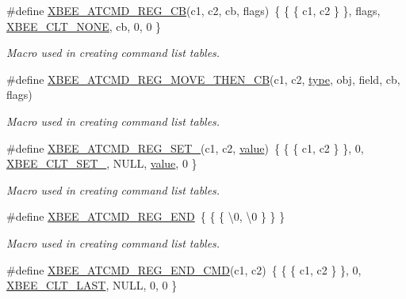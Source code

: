 \begin{DoxyCompactItemize}
\#define \hyperlink{group__xbee__atcmd_gabbaf60bd4d186b860fd58c8a6111e9f9}{X\+B\+E\+E\+\_\+\+A\+T\+C\+M\+D\+\_\+\+R\+E\+G\+\_\+\+CB}(c1,  c2,  cb,  flags)~\{ \{ \{ c1, c2 \} \}, flags, \hyperlink{group__xbee__atcmd_gga1bd8ecd38c107579d20ded3c79a7d70ba01bd43706bd844415cc0882b861df4d1}{X\+B\+E\+E\+\_\+\+C\+L\+T\+\_\+\+N\+O\+NE}, cb, 0, 0 \}
\begin{DoxyCompactList}\small\item\em Macro used in creating command list tables. \end{DoxyCompactList}\item 
\#define \hyperlink{group__xbee__atcmd_gaf5f12cd2d94f9f4ecf0a679196a6ed21}{X\+B\+E\+E\+\_\+\+A\+T\+C\+M\+D\+\_\+\+R\+E\+G\+\_\+\+M\+O\+V\+E\+\_\+\+T\+H\+E\+N\+\_\+\+CB}(c1,  c2,  \hyperlink{group__zcl_ga1d127017fb298b889f4ba24752d08b8e}{type},  obj,  field,  cb,  flags)
\begin{DoxyCompactList}\small\item\em Macro used in creating command list tables. \end{DoxyCompactList}\item 
\#define \hyperlink{group__xbee__atcmd_ga37dcc1cfc854d7876be99eff279bf2a0}{X\+B\+E\+E\+\_\+\+A\+T\+C\+M\+D\+\_\+\+R\+E\+G\+\_\+\+S\+E\+T\+\_}(c1,  c2,  \hyperlink{group__zcl_ga1ed5b151a90f7e99af8cca2e6875ddf4}{value})~\{ \{ \{ c1, c2 \} \}, 0, \hyperlink{group__xbee__atcmd_gga1bd8ecd38c107579d20ded3c79a7d70ba0eb2ffa9c761ab74335695f818ce8410}{X\+B\+E\+E\+\_\+\+C\+L\+T\+\_\+\+S\+E\+T\+\_}, N\+U\+LL, \hyperlink{group__zcl_ga1ed5b151a90f7e99af8cca2e6875ddf4}{value}, 0 \}
\begin{DoxyCompactList}\small\item\em Macro used in creating command list tables. \end{DoxyCompactList}\item 
\#define \hyperlink{group__xbee__atcmd_ga22fe547f7ae9fd0b090c5e45f03c162d}{X\+B\+E\+E\+\_\+\+A\+T\+C\+M\+D\+\_\+\+R\+E\+G\+\_\+\+E\+ND}~\{ \{ \{ \textquotesingle{}\textbackslash{}0\textquotesingle{}, \textquotesingle{}\textbackslash{}0\textquotesingle{} \} \} \}
\begin{DoxyCompactList}\small\item\em Macro used in creating command list tables. \end{DoxyCompactList}\item 
\#define \hyperlink{group__xbee__atcmd_gaaed20e2dcb547e8a3256e1168e1c95b0}{X\+B\+E\+E\+\_\+\+A\+T\+C\+M\+D\+\_\+\+R\+E\+G\+\_\+\+E\+N\+D\+\_\+\+C\+MD}(c1,  c2)~\{ \{ \{ c1, c2 \} \}, 0, \hyperlink{group__xbee__atcmd_gga1bd8ecd38c107579d20ded3c79a7d70ba6e78c45780bccbc7226af34868dc567f}{X\+B\+E\+E\+\_\+\+C\+L\+T\+\_\+\+L\+A\+ST}, N\+U\+LL, 0, 0 \}

\end{DoxyCompactItemize}
